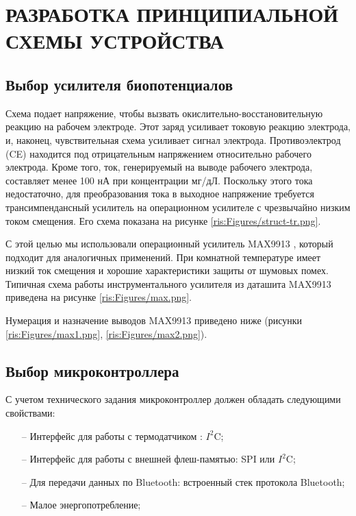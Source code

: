 \begin{sloppypar} %
\newpage %
\section{РАЗРАБОТКА ПРИНЦИПИАЛЬНОЙ СХЕМЫ УСТРОЙСТВА} %


\subsection{Выбор усилителя биопотенциалов}
Схема подает напряжение, чтобы вызвать окислительно-восстановительную реакцию на рабочем электроде. Этот заряд усиливает токовую реакцию электрода, и, наконец, чувствительная схема усиливает сигнал электрода. Противоэлектрод (CE) находится под отрицательным напряжением относительно рабочего электрода. Кроме того, ток, генерируемый на выводе рабочего электрода, составляет менее 100 нА при концентрации мг/дЛ. Поскольку этого тока недостаточно, для преобразования тока в выходное напряжение требуется трансимпендансный усилитель на операционном усилителе с чрезвычайно низким током смещения. Его схема показана на  рисунке \ref{ris:Figures/struct-tr.png}. 



С этой целью мы использовали операционный усилитель MAX9913 \cite{MAX9913}, который подходит для аналогичных применений. При комнатной температуре имеет низкий ток смещения и хорошие характеристики защиты от шумовых помех. Типичная схема работы инструментального усилителя из даташита MAX9913 приведена на рисунке  \ref{ris:Figures/max.png}. 

Нумерация и назначение выводов MAX9913 приведено ниже (рисунки \ref{ris:Figures/max1.png}, \ref{ris:Figures/max2.png}).





\subsection{Выбор микроконтроллера}
С учетом технического задания микроконтроллер должен обладать следующими свойствами:
\begin{onehalfspace}
	\begin{itemize}
		\item[--]Интерфейс для работы с термодатчиком :  $I^2$C;
		\item[--]Интерфейс для работы с внешней флеш-памятью: SPI или $I^2$C;
		\item[--]Для передачи данных по Bluetooth: встроенный стек протокола Bluetooth;
		\item[--]Малое энергопотребление;
	\end{itemize}
\end{onehalfspace}


\end{sloppypar}
